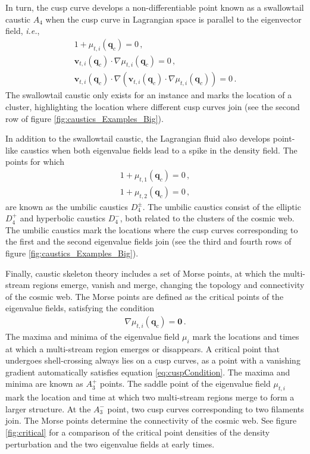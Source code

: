 \documentclass[a4paper, 11pt]{article}
\begin{document}
In turn, the cusp curve develops a non-differentiable point known as a swallowtail caustic $A_4$ when the cusp curve in Lagrangian space is parallel to the eigenvector field, \textit{i.e.},
\begin{align}
1+\mu_{t,i}(\bm{q}_c)=0\,,\\
\bm{v}_{t,i}(\bm{q}_c) \cdot \nabla \mu_{t,i}(\bm{q}_c)=0\,,\\
\bm{v}_{t,i}(\bm{q}_c) \cdot \nabla (\bm{v}_{t,i}(\bm{q}_c) \cdot \nabla \mu_{t,i}(\bm{q}_c)) = 0\,.
\end{align}
The swallowtail caustic only exists for an instance and marks the location of a cluster, highlighting the location where different cusp curves join (see the second row of figure \ref{fig:caustics_Examples_Big}). 

In addition to the swallowtail caustic, the Lagrangian fluid also develops point-like caustics when both eigenvalue fields lead to a spike in the density field. The points for which
\begin{align}
1+\mu_{t,1}(\bm{q}_c) =0\,,\\
1+\mu_{t,2}(\bm{q}_c) = 0\,,
\end{align}
are known as the umbilic caustics $D_4^\pm$. The umbilic caustics consist of the elliptic $D_4^+$ and hyperbolic caustics $D_4^-$, both related to the clusters of the cosmic web. The umbilic caustics mark the locations where the cusp curves corresponding to the first and the second eigenvalue fields join (see the third and fourth rows of figure \ref{fig:caustics_Examples_Big}). 

Finally, caustic skeleton theory includes a set of Morse points, at which the multi-stream regions emerge, vanish and merge, changing the topology and connectivity of the cosmic web. The Morse points are defined as the critical points of the eigenvalue fields, satisfying the condition
\begin{align}
\nabla \mu_{t,i}(\bm{q}_c)=\bm{0}\,.
\end{align}
The maxima and minima of the eigenvalue field $\mu_i$ mark the locations and times at which a multi-stream region emerges or disappears. A critical point that undergoes shell-crossing always lies on a cusp curves, as a point with a vanishing gradient automatically satisfies equation \eqref{eq:cuspCondition}. The maxima and minima are known as $A_3^+$ points. The saddle point of the eigenvalue field $\mu_{t,i}$ mark the location and time at which two multi-stream regions merge to form a larger structure. At the $A_3^-$ point, two cusp curves corresponding to two filaments join. The Morse points determine the connectivity of the cosmic web. See figure \ref{fig:critical} for a comparison of the critical point densities of the density perturbation and the two eigenvalue fields at early times.
\end{document}
